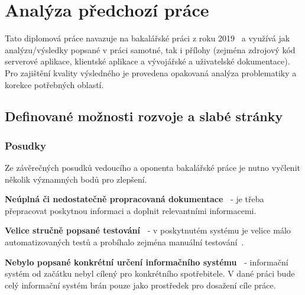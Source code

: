 \chapter{Analýza předchozí práce}\label{ch:analysis}


Tato diplomová práce navazuje na bakalářské práci z roku 2019~\cite{bachelorthesis} a využívá jak analýzu/výsledky popsané v práci samotné, tak i přílohy (zejména zdrojový kód serverové aplikace, klientské aplikace a vývojářské a uživatelské dokumentace).
Pro zajištění kvality výsledného  je provedena opakovaná analýza problematiky a korekce potřebných oblastí.



\section{Definované možnosti rozvoje a slabé stránky}



\subsection{Posudky}
Ze závěrečných posudků vedoucího a oponenta bakalářské práce je nutno vyčlenit několik významných bodů pro zlepšení.

\begin{ul}
   \item
   \textbf{Neúplná či nedostatečně propracovaná dokumentace~\cite{bachelorthesisreportsupervisor}} - je třeba přepracovat poskytnou informaci a doplnit relevantními informacemi.
   \item
   \textbf{Velice stručně popsané testování~\cite{bachelorthesisreportreviewer}} - v poskytnutém systému je velice málo automatizovaných testů a probíhalo zejména manuální testování~\cite{bachelorthesis}.
   \item
   \textbf{Nebylo popsané konkrétní určení informačního systému~\cite{bachelorthesisreportreviewer}} - informační systém od začátku nebyl cílený pro konkrétního spotřebitele.
   V dané práci bude celý informační systém brán pouze jako prostředek pro dosažení cíle práce.
\end{ul}

